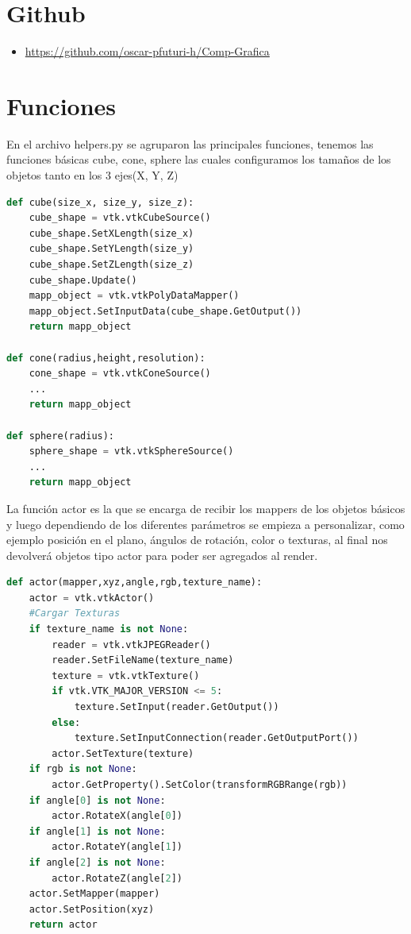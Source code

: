 \documentclass[11pt]{article}
\begin{document}
\tableofcontents 

\newpage
\section{Github}

\begin{itemize}
    \item \url{https://github.com/oscar-pfuturi-h/Comp-Grafica}
\end{itemize}

\section{Funciones}
En el archivo helpers.py se agruparon las principales funciones, tenemos las funciones básicas cube, cone, sphere las cuales configuramos los tamaños de los objetos tanto en los 3 ejes(X, Y, Z)
\begin{lstlisting}[language=python,frame=single]
def cube(size_x, size_y, size_z):
    cube_shape = vtk.vtkCubeSource()
    cube_shape.SetXLength(size_x)
    cube_shape.SetYLength(size_y)
    cube_shape.SetZLength(size_z)
    cube_shape.Update()
    mapp_object = vtk.vtkPolyDataMapper()
    mapp_object.SetInputData(cube_shape.GetOutput())
    return mapp_object

def cone(radius,height,resolution):
    cone_shape = vtk.vtkConeSource()
    ...
    return mapp_object

def sphere(radius):
    sphere_shape = vtk.vtkSphereSource()
    ...
    return mapp_object
\end{lstlisting}

La función actor es la que se encarga de recibir los mappers de los objetos básicos y luego dependiendo de los diferentes parámetros se empieza a personalizar, como ejemplo posición en el plano, ángulos de rotación, color o texturas, al final nos devolverá objetos tipo actor para poder ser agregados al render.
\begin{lstlisting}[language=python,frame=single]
def actor(mapper,xyz,angle,rgb,texture_name):
    actor = vtk.vtkActor()
    #Cargar Texturas
    if texture_name is not None:
        reader = vtk.vtkJPEGReader()
        reader.SetFileName(texture_name)
        texture = vtk.vtkTexture()
        if vtk.VTK_MAJOR_VERSION <= 5:
            texture.SetInput(reader.GetOutput())
        else:
            texture.SetInputConnection(reader.GetOutputPort())
        actor.SetTexture(texture)
    if rgb is not None:
        actor.GetProperty().SetColor(transformRGBRange(rgb))
    if angle[0] is not None:
        actor.RotateX(angle[0])
    if angle[1] is not None:
        actor.RotateY(angle[1])
    if angle[2] is not None:
        actor.RotateZ(angle[2])
    actor.SetMapper(mapper)
    actor.SetPosition(xyz)
    return actor
\end{lstlisting}
\end{document}
